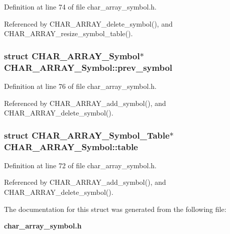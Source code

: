 Definition at line 74 of file char\_\-array\_\-symbol.h.

Referenced by CHAR\_\-ARRAY\_\-delete\_\-symbol(), and CHAR\_\-ARRAY\_\-resize\_\-symbol\_\-table().
\subsubsection{\setlength{\rightskip}{0pt plus 5cm}struct \bf{CHAR\_\-ARRAY\_\-Symbol}$\ast$ \bf{CHAR\_\-ARRAY\_\-Symbol::prev\_\-symbol}}\label{structCHAR__ARRAY__Symbol_4ecf4360124b344d08f40ac95ca53503}




Definition at line 76 of file char\_\-array\_\-symbol.h.

Referenced by CHAR\_\-ARRAY\_\-add\_\-symbol(), and CHAR\_\-ARRAY\_\-delete\_\-symbol().
\subsubsection{\setlength{\rightskip}{0pt plus 5cm}struct \bf{CHAR\_\-ARRAY\_\-Symbol\_\-Table}$\ast$ \bf{CHAR\_\-ARRAY\_\-Symbol::table}}\label{structCHAR__ARRAY__Symbol_f95a1e2cfaf5ff875d269d64eb99a4e8}




Definition at line 72 of file char\_\-array\_\-symbol.h.

Referenced by CHAR\_\-ARRAY\_\-add\_\-symbol(), and CHAR\_\-ARRAY\_\-delete\_\-symbol().

The documentation for this struct was generated from the following file:\begin{CompactItemize}
\item 
\bf{char\_\-array\_\-symbol.h}\end{CompactItemize}
